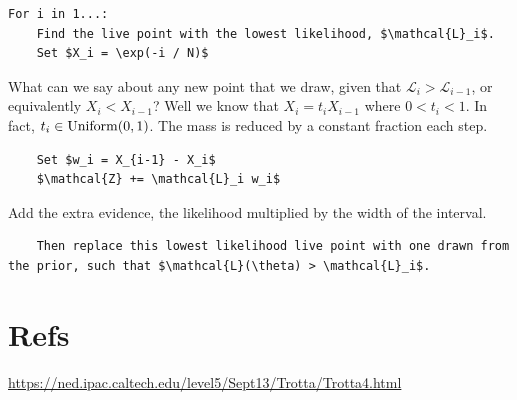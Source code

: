 \documentclass[useAMS,usenatbib,onecolumn]{mnras}
\begin{document}
\begin{lstlisting}
For i in 1...:
    Find the live point with the lowest likelihood, $\mathcal{L}_i$.
    Set $X_i = \exp(-i / N)$
\end{lstlisting}

What can we say about any new point that we draw, given that $\mathcal{L}_i > \mathcal{L}_{i-1}$, or equivalently $X_i < X_{i-1}$? Well we know that $X_i = t_i X_{i-1}$ where $0 < t_i < 1$. In fact, $t_i \in {\rm Uniform}(0, 1)$. The mass is reduced by a constant fraction each step.

\begin{lstlisting}
    Set $w_i = X_{i-1} - X_i$
    $\mathcal{Z} += \mathcal{L}_i w_i$
\end{lstlisting}

Add the extra evidence, the likelihood multiplied by the width of the interval.

\begin{lstlisting}
    Then replace this lowest likelihood live point with one drawn from the prior, such that $\mathcal{L}(\theta) > \mathcal{L}_i$.
\end{lstlisting}





\section{Refs}

\cite{Speagle2020}
\cite{Skilling2006}

\url{https://ned.ipac.caltech.edu/level5/Sept13/Trotta/Trotta4.html}




\end{document}
